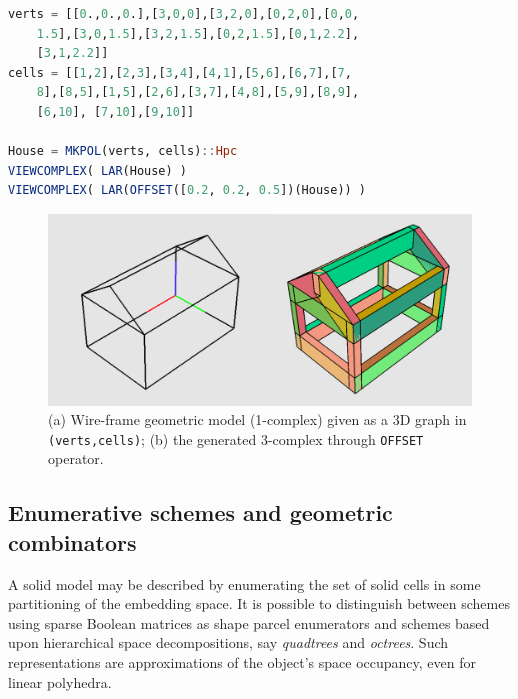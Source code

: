 \documentclass{juliacon}
\begin{document}
\begin{lstlisting}[language = Julia,numbers=none,label={lst:exmpl10},
caption={House 3D model by Minkowsky {\tt OFFSET}.}
]
verts = [[0.,0.,0.],[3,0,0],[3,2,0],[0,2,0],[0,0,
	1.5],[3,0,1.5],[3,2,1.5],[0,2,1.5],[0,1,2.2],
	[3,1,2.2]]
cells = [[1,2],[2,3],[3,4],[4,1],[5,6],[6,7],[7,
	8],[8,5],[1,5],[2,6],[3,7],[4,8],[5,9],[8,9],
	[6,10], [7,10],[9,10]]

House = MKPOL(verts, cells)::Hpc
VIEWCOMPLEX( LAR(House) )
VIEWCOMPLEX( LAR(OFFSET([0.2, 0.2, 0.5])(House)) )
\end{lstlisting}
\vspace{-5mm}
\begin{figure}[htbp] %
   \centering
   \includegraphics[width=\linewidth]{figs/offset} 
   \caption{(a) Wire-frame geometric model (1-complex) given as a 3D graph in {\tt (verts,cells)}; (b) the generated 3-complex through {\tt OFFSET} operator.}
   \label{fig:houseoffset}
\end{figure}



\subsection{Enumerative schemes and geometric combinators}
\label{subsec:title_auth}
A solid model may be described by enumerating the set of solid cells in some partitioning of the embedding space.  It is possible to distinguish between schemes using sparse Boolean matrices as shape parcel enumerators and schemes based upon hierarchical space decompositions, say \emph{quadtrees} and \emph{octrees}.  Such representations are approximations of the object's space occupancy, even for linear polyhedra. 
\end{document}
